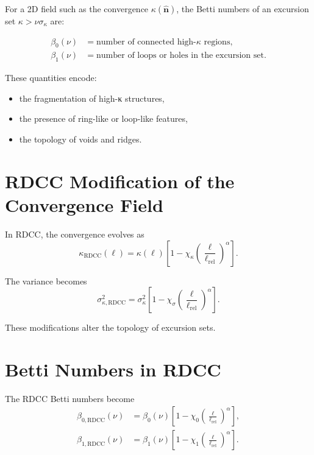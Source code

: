\documentclass[11pt,a4paper]{article}
\begin{document}
For a 2D field such as the convergence $\kappa(\hat{\mathbf{n}})$, the Betti 
numbers of an excursion set $\kappa > \nu\sigma_{\kappa}$ are:

\begin{align}
    \beta_{0}(\nu) &= \text{number of connected high-}\kappa\text{ regions}, \\
    \beta_{1}(\nu) &= \text{number of loops or holes in the excursion set}.
\end{align}

These quantities encode:

\begin{itemize}
    \item the fragmentation of high-κ structures,
    \item the presence of ring-like or loop-like features,
    \item the topology of voids and ridges.
\end{itemize}
\section{RDCC Modification of the Convergence Field}

In RDCC, the convergence evolves as
\begin{equation}
    \kappa_{\mathrm{RDCC}}(\ell)
    = \kappa(\ell)
      \left[
        1 - \chi_{\kappa}
        \left(\frac{\ell}{\ell_{\mathrm{rel}}}\right)^{\alpha}
      \right].
\end{equation}

The variance becomes
\begin{equation}
    \sigma_{\kappa,\mathrm{RDCC}}^{2}
    = \sigma_{\kappa}^{2}
      \left[
        1 - \chi_{\sigma}
        \left(\frac{\ell}{\ell_{\mathrm{rel}}}\right)^{\alpha}
      \right].
\end{equation}

These modifications alter the topology of excursion sets.
\section{Betti Numbers in RDCC}

The RDCC Betti numbers become
\begin{align}
    \beta_{0,\mathrm{RDCC}}(\nu)
    &= \beta_{0}(\nu)
       \left[
         1 - \chi_{0}
         \left(\frac{\ell}{\ell_{\mathrm{rel}}}\right)^{\alpha}
       \right], \\
    \beta_{1,\mathrm{RDCC}}(\nu)
    &= \beta_{1}(\nu)
       \left[
         1 - \chi_{1}
         \left(\frac{\ell}{\ell_{\mathrm{rel}}}\right)^{\alpha}
       \right].
\end{align}
\end{document}
